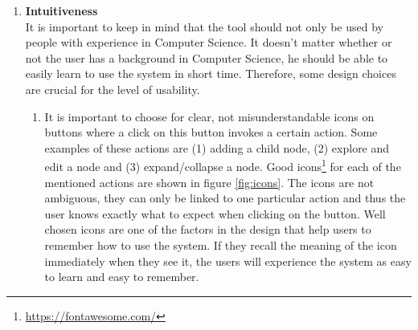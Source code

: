 \begin{enumerate}[label=\textbf{\arabic*}., ref=\arabic*]
	\item \textbf{Intuitiveness\label{item:intuitiveness}} \hfill \\
	It is important to keep in mind that the tool should not only be used by people with experience in Computer Science. It doesn't matter whether or not the user has a background in Computer Science, he should be able to easily learn to use the system in short time. Therefore, some design choices are crucial for the level of usability. 
	
	\begin{enumerate}
	
		\item It is important to choose for clear, not misunderstandable icons on buttons where a click on this button invokes a certain action. Some examples of these actions are (1) adding a child node, (2) explore and edit a node and (3) expand/collapse a node. Good icons\footnote{\url{https://fontawesome.com/}} for each of the mentioned actions are shown in figure \ref{fig:icons}. The icons are not ambiguous, they can only be linked to one particular action and thus the user knows exactly what to expect when clicking on the button. Well chosen icons are one of the factors in the design that help users to remember how to use the system. If they recall the meaning of the icon immediately when they see it, the users will experience the system as easy to learn and easy to remember.\\
	

\end{enumerate}
\end{enumerate}
